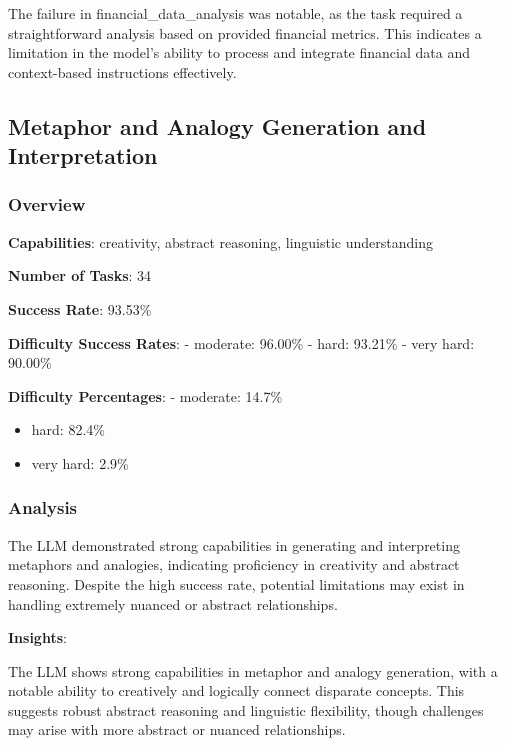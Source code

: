 \documentclass[fleqn,10pt]{wlscirep}
\begin{document}
The failure in financial\_data\_analysis was notable, as the task
required a straightforward analysis based on provided financial metrics.
This indicates a limitation in the model's ability to process and
integrate financial data and context-based instructions effectively.

\hypertarget{metaphor-and-analogy-generation-and-interpretation}{%
\subsection{Metaphor and Analogy Generation and
Interpretation}\label{metaphor-and-analogy-generation-and-interpretation}}

\hypertarget{overview-20}{%
\subsubsection{Overview}\label{overview-20}}

\textbf{Capabilities}: creativity, abstract reasoning, linguistic
understanding

\textbf{Number of Tasks}: 34

\textbf{Success Rate}: 93.53\%

\textbf{Difficulty Success Rates}: - moderate: 96.00\% - hard: 93.21\% -
very hard: 90.00\%

\textbf{Difficulty Percentages}: - moderate: 14.7\%

\begin{itemize}
\item
  hard: 82.4\%
\item
  very hard: 2.9\%
\end{itemize}

\hypertarget{analysis-18}{%
\subsubsection{Analysis}\label{analysis-18}}

The LLM demonstrated strong capabilities in generating and interpreting
metaphors and analogies, indicating proficiency in creativity and
abstract reasoning. Despite the high success rate, potential limitations
may exist in handling extremely nuanced or abstract relationships.

\textbf{Insights}:

The LLM shows strong capabilities in metaphor and analogy generation,
with a notable ability to creatively and logically connect disparate
concepts. This suggests robust abstract reasoning and linguistic
flexibility, though challenges may arise with more abstract or nuanced
relationships.
\end{document}
